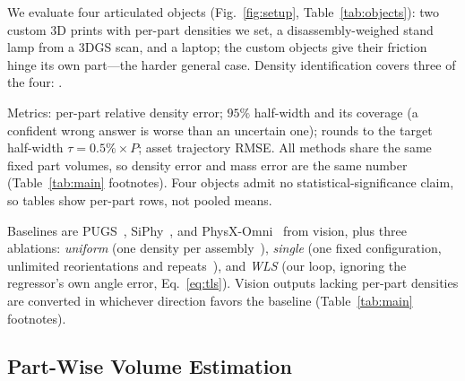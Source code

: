 We evaluate four articulated objects (Fig.~\ref{fig:setup},
Table~\ref{tab:objects}): two custom 3D
prints with per-part densities we set, a disassembly-weighed stand lamp from
a 3DGS scan, and a laptop; the custom objects give their friction hinge its
own part---the harder general case. Density
identification covers three of the four: .

Metrics: per-part relative density error; $95\%$ half-width and its
coverage (a confident wrong answer is worse than an uncertain one); rounds
to the target half-width $\tau=0.5\%\times P$; asset trajectory RMSE. All
methods share the same fixed part volumes, so density error and mass error
are the same number (Table~\ref{tab:main} footnotes). Four objects admit no
statistical-significance claim, so tables show per-part rows, not pooled
means.

Baselines are PUGS~\cite{shuai2025pugs}, SiPhy~\cite{le2026siphy}, and
PhysX-Omni~\cite{cao2026physxomni} from vision, plus three ablations:
\emph{uniform} (one density per assembly~\cite{pfaff2025scalable}),
\emph{single} (one fixed configuration, unlimited reorientations and
repeats~\cite{nadeau2023sum}), and \emph{WLS} (our loop, ignoring the
regressor's own angle error, Eq.~\eqref{eq:tls}). Vision outputs lacking
per-part densities are converted in whichever direction favors the baseline
(Table~\ref{tab:main} footnotes).


\subsection{Part-Wise Volume Estimation}
\label{sec:vol}

